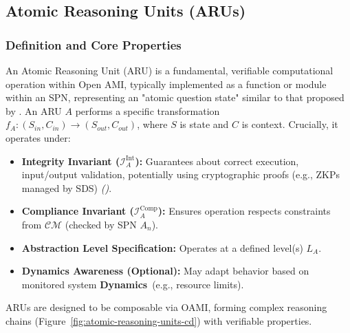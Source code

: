 \documentclass[12pt,a4paper]{report}
\renewcommand{\citep}[1]{\textit{\scriptsize{(\cite{#1})}}}
\newcommand{\Dynamics}{\textbf{Dynamics}}
\begin{document}
	\subsection{Atomic Reasoning Units (ARUs)}
	\label{sec:2-4-2}
	
	\subsubsection{Definition and Core Properties}
	
	An Atomic Reasoning Unit (ARU) is a fundamental, verifiable computational operation within Open AMI, typically implemented as a function or module within an SPN, representing an "atomic question state" similar to that proposed by \citet{Teng2025AtomOfThoughtsRef}.
	An ARU $A$ performs a specific transformation $f_A: (S_{in}, C_{in}) \rightarrow (S_{out}, C_{out})$, where $S$ is state and $C$ is context. Crucially, it operates under:
	\begin{itemize}
		\item \textbf{Integrity Invariant ($\mathcal{I}_A^{\text{Int}}$):} Guarantees about correct execution, input/output validation, potentially using cryptographic proofs (e.g., ZKPs managed by SDS) \citep{Peng2025ZKMLSurvey}.
		\item \textbf{Compliance Invariant ($\mathcal{I}_A^{\text{Comp}}$):} Ensures operation respects constraints from $\mathcal{CM}$ (checked by SPN $A_n$).
		\item \textbf{Abstraction Level Specification:} Operates at a defined level(s) $L_A$.
		\item \textbf{Dynamics Awareness (Optional):} May adapt behavior based on monitored system \Dynamics\ (e.g., resource limits).
	\end{itemize}
	ARUs are designed to be composable via OAMI, forming complex reasoning chains (Figure~\ref{fig:atomic-reasoning-units-cd}) with verifiable properties.
	
\end{document}

